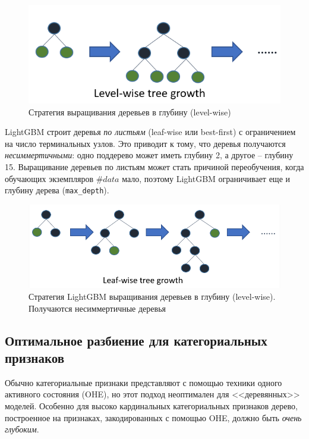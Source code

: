 \documentclass[%
	11pt,
	a4paper,
	utf8,
		]{article}
\begin{document}
\begin{figure}[h]
	\centering
	\includegraphics[scale=1.0]{figures/level_wise.png}
	\caption{ Стратегия выращивания деревьев в глубину (level-wise) }\label{fig:level_wise}
\end{figure}

LightGBM строит деревья \emph{по листьям} (leaf-wise или best-first)  с ограничением на число терминальных узлов. Это приводит к тому, что деревья получаются \emph{несиммертичными}: одно поддерево может иметь глубину 2, а другое -- глубину 15. Выращивание деревьев по листьям может стать причиной переобучения, когда обучающих экземпляров $ \#data $ мало, поэтому LightGBM ограничивает еще и глубину дерева (\verb|max_depth|).

\begin{figure}[h]
	\centering
	\includegraphics[scale=1.0]{figures/lgb_leaf_wise.png}
	\caption{ Стратегия LightGBM выращивания деревьев в глубину (level-wise). Получаются несиммертичные деревья }\label{fig:lgb_leaf_wise}
\end{figure}

\subsection{Оптимальное разбиение для категориальных признаков}

Обычно категориальные признаки представляют с помощью техники одного активного состояния (OHE), но этот подход неоптимален для <<деревянных>> моделей. Особенно для высоко кардинальных категориальных признаков дерево, построенное на признаках, закодированных с помощью OHE, должно быть \emph{очень глубоким}.
\end{document}

